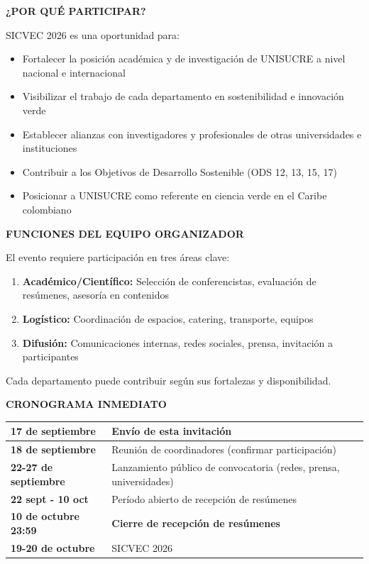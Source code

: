 \documentclass[12pt,a4paper]{article}
\begin{document}
\vspace{0.5cm}

\noindent
\textbf{¿POR QUÉ PARTICIPAR?}

SICVEC 2026 es una oportunidad para:

\begin{itemize}
  \item Fortalecer la posición académica y de investigación de UNISUCRE a nivel nacional e internacional
  \item Visibilizar el trabajo de cada departamento en sostenibilidad e innovación verde
  \item Establecer alianzas con investigadores y profesionales de otras universidades e instituciones
  \item Contribuir a los Objetivos de Desarrollo Sostenible (ODS 12, 13, 15, 17)
  \item Posicionar a UNISUCRE como referente en ciencia verde en el Caribe colombiano
\end{itemize}

\vspace{0.5cm}

\noindent
\textbf{FUNCIONES DEL EQUIPO ORGANIZADOR}

El evento requiere participación en tres áreas clave:

\begin{enumerate}
  \item \textbf{Académico/Científico:} Selección de conferencistas, evaluación de resúmenes, asesoría en contenidos
  \item \textbf{Logístico:} Coordinación de espacios, catering, transporte, equipos
  \item \textbf{Difusión:} Comunicaciones internas, redes sociales, prensa, invitación a participantes
\end{enumerate}

Cada departamento puede contribuir según sus fortalezas y disponibilidad.

\vspace{0.5cm}

\noindent
\textbf{CRONOGRAMA INMEDIATO}

\begin{tabular}{|l|l|}
\hline
\textbf{17 de septiembre} & Envío de esta invitación \\
\hline
\textbf{18 de septiembre} & Reunión de coordinadores (confirmar participación) \\
\hline
\textbf{22-27 de septiembre} & Lanzamiento público de convocatoria (redes, prensa, universidades) \\
\hline
\textbf{22 sept - 10 oct} & Período abierto de recepción de resúmenes \\
\hline
\textbf{10 de octubre 23:59} & \textbf{Cierre de recepción de resúmenes} \\
\hline
\textbf{19-20 de octubre} & SICVEC 2026 \\
\hline
\end{tabular}
\end{document}
